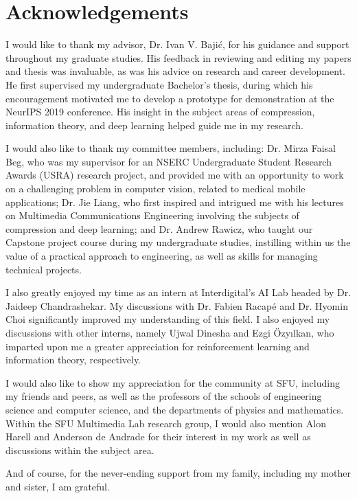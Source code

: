 \chapter*{Acknowledgements}

I would like to thank my advisor, Dr. Ivan V. Bajić, for his guidance and support throughout my graduate studies.
His feedback in reviewing and editing my papers and thesis was invaluable, as was his advice on research and career development.
He first supervised my undergraduate Bachelor's thesis, during which his encouragement motivated me to develop a prototype for demonstration at the NeurIPS 2019 conference.
His insight in the subject areas of compression, information theory, and deep learning helped guide me in my research.

I would also like to thank my committee members, including:
Dr. Mirza Faisal Beg, who was my supervisor for an NSERC Undergraduate Student Research Awards (USRA) research project, and provided me with an opportunity to work on a challenging problem in computer vision, related to medical mobile applications;
Dr. Jie Liang, who first inspired and intrigued me with his lectures on Multimedia Communications Engineering involving the subjects of compression and deep learning;
and Dr. Andrew Rawicz, who taught our Capstone project course during my undergraduate studies, instilling within us the value of a practical approach to engineering, as well as skills for managing technical projects.

I also greatly enjoyed my time as an intern at Interdigital's AI Lab headed by Dr. Jaideep Chandrashekar.
My discussions with Dr. Fabien Racapé and Dr. Hyomin Choi significantly improved my understanding of this field.
I also enjoyed my discussions with other interns, namely Ujwal Dinesha and Ezgi Özyılkan, who imparted upon me a greater appreciation for reinforcement learning and information theory, respectively.

I would also like to show my appreciation for the community at SFU, including my friends and peers, as well as the professors of the schools of engineering science and computer science, and the departments of physics and mathematics.
Within the SFU Multimedia Lab research group, I would also mention Alon Harell and Anderson de Andrade for their interest in my work as well as discussions within the subject area.

And of course, for the never-ending support from my family, including my mother and sister, I am grateful.


%
%
%

